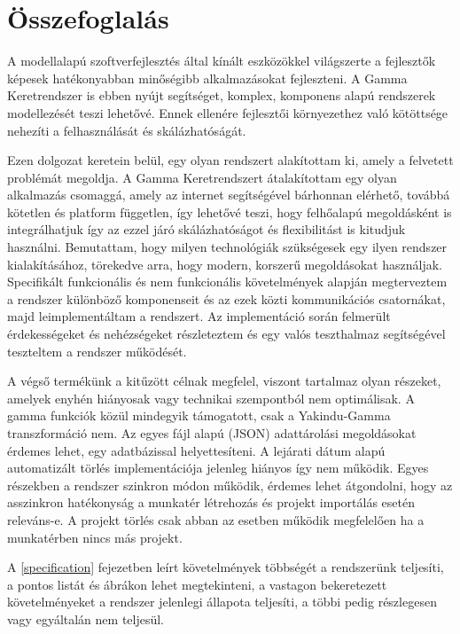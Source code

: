 \chapter{Összefoglalás}

A modellalapú szoftverfejlesztés által kínált eszközökkel világszerte a fejlesztők képesek hatékonyabban minőségibb alkalmazásokat fejleszteni. A Gamma Keretrendszer is ebben nyújt segítséget, komplex, komponens alapú rendszerek modellezését teszi lehetővé. Ennek ellenére fejlesztői környezethez való kötöttsége nehezíti a felhasználását és skálázhatóságát.

Ezen dolgozat keretein belül, egy olyan rendszert alakítottam ki, amely a felvetett problémát megoldja. A Gamma Keretrendszert átalakítottam egy olyan alkalmazás csomaggá, amely az internet segítségével bárhonnan elérhető, továbbá kötetlen és platform független, így lehetővé teszi, hogy felhőalapú megoldásként is integrálhatjuk így az ezzel járó skálázhatóságot és flexibilitást is kitudjuk használni. 
Bemutattam, hogy milyen technológiák szükségesek egy ilyen rendszer kialakításához, törekedve arra, hogy modern, korszerű megoldásokat használjak. Specifikált funkcionális és nem funkcionális követelmények alapján megterveztem a rendszer különböző komponenseit és az ezek közti kommunikációs csatornákat, majd leimplementáltam a rendszert. Az implementáció során felmerült érdekességeket és nehézségeket részleteztem és egy valós teszthalmaz segítségével teszteltem a rendszer működését.

A végső termékünk a kitűzött célnak megfelel, viszont tartalmaz olyan részeket, amelyek enyhén hiányosak vagy technikai szempontból nem optimálisak. A gamma funkciók közül mindegyik támogatott, csak a Yakindu-Gamma transzformáció nem. Az egyes fájl alapú (JSON) adattárolási megoldásokat érdemes lehet, egy adatbázissal helyettesíteni. A lejárati dátum alapú automatizált törlés implementációja jelenleg hiányos így nem működik. Egyes részekben a rendszer szinkron módon működik, érdemes lehet átgondolni, hogy az asszinkron hatékonyság a munkatér létrehozás és projekt importálás esetén releváns-e. A projekt törlés csak abban az esetben működik megfelelően ha a munkatérben nincs más projekt.

 
A \ref{specification} fejezetben leírt követelmények többségét a rendszerünk teljesíti, a pontos listát  és  ábrákon lehet megtekinteni, a vastagon bekeretezett követelményeket a rendszer jelenlegi állapota teljesíti, a többi pedig részlegesen vagy egyáltalán nem teljesül.

